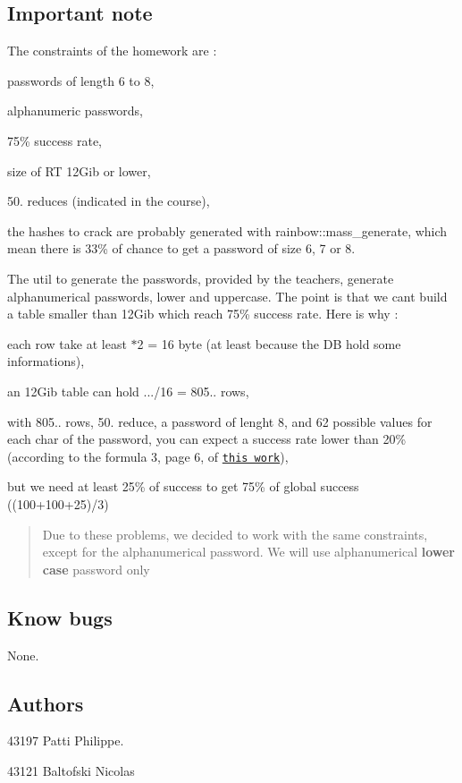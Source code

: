 \subsection*{Important note}

The constraints of the homework are \+:
\begin{DoxyItemize}
\item passwords of length 6 to 8,
\item alphanumeric passwords,
\item 75\% success rate,
\item size of RT 12\+Gib or lower,
\item 50. reduces (indicated in the course),
\item the hashes to crack are probably generated with rainbow\+:\+:mass\+\_\+generate, which mean there is 33\% of chance to get a password of size 6, 7 or 8.
\end{DoxyItemize}

The util to generate the passwords, provided by the teachers, generate alphanumerical passwords, lower and uppercase. The point is that we can\textquotesingle{}t build a table smaller than 12\+Gib which reach 75\% success rate. Here is why \+:
\begin{DoxyItemize}
\item each row take at least {$\ast$2 = 16} byte (at least because the DB hold some informations),
\item an 12\+Gib table can hold {.../16 = 805..} rows,
\item with 805.. rows, 50. reduce, a password of lenght 8, and 62 possible values for each char of the password, you can expect a success rate lower than 20\% (according to the formula 3, page 6, of \href{https://lasecwww.epfl.ch/pub/lasec/doc/Oech03.pdf}{\tt this work}),
\item but we need at least 25\% of success to get 75\% of global success ({\ttfamily (100+100+25)/3})
\end{DoxyItemize}

\begin{quote}
Due to these problems, we decided to work with the same constraints, except for the alphanumerical password. We will use alphanumerical {\bfseries lower case} password only \end{quote}


\subsection*{Know bugs}

None.

\subsection*{Authors}

43197 Patti Philippe.

43121 Baltofski Nicolas 